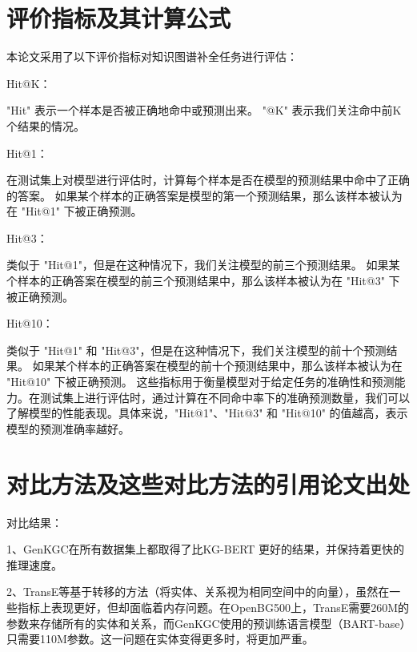 \documentclass{article}
\begin{document}
\section{评价指标及其计算公式}

本论文采用了以下评价指标对知识图谱补全任务进行评估：

\par Hit@K：

\par "Hit" 表示一个样本是否被正确地命中或预测出来。
"@K" 表示我们关注命中前K个结果的情况。
\par Hit@1：

在测试集上对模型进行评估时，计算每个样本是否在模型的预测结果中命中了正确的答案。
如果某个样本的正确答案是模型的第一个预测结果，那么该样本被认为在 "Hit@1" 下被正确预测。
\par Hit@3：

类似于 "Hit@1"，但是在这种情况下，我们关注模型的前三个预测结果。
如果某个样本的正确答案在模型的前三个预测结果中，那么该样本被认为在 "Hit@3" 下被正确预测。
\par Hit@10：

类似于 "Hit@1" 和 "Hit@3"，但是在这种情况下，我们关注模型的前十个预测结果。
如果某个样本的正确答案在模型的前十个预测结果中，那么该样本被认为在 "Hit@10" 下被正确预测。
这些指标用于衡量模型对于给定任务的准确性和预测能力。在测试集上进行评估时，通过计算在不同命中率下的准确预测数量，我们可以了解模型的性能表现。具体来说，"Hit@1"、"Hit@3" 和 "Hit@10" 的值越高，表示模型的预测准确率越好。
\section{对比方法及这些对比方法的引用论文出处}
\par 对比结果：

1、GenKGC在所有数据集上都取得了比KG-BERT 更好的结果，并保持着更快的推理速度。

2、TransE等基于转移的方法（将实体、关系视为相同空间中的向量），虽然在一些指标上表现更好，但却面临着内存问题。在OpenBG500上，TransE需要260M的参数来存储所有的实体和关系，而GenKGC使用的预训练语言模型（BART\BERT-base）只需要110M参数。这一问题在实体变得更多时，将更加严重。
\end{document}
